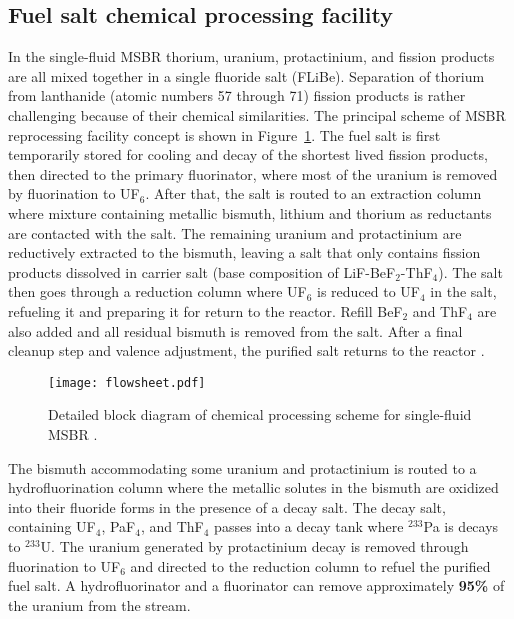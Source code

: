 \subsection{Fuel salt chemical processing facility}
In the single-fluid \gls{MSBR} thorium, uranium, 
protactinium, and fission products are all mixed together in a single fluoride salt (FLiBe). Separation of thorium from lanthanide (atomic numbers 57 through 71) fission products is rather challenging because of their chemical similarities. The principal scheme of \gls{MSBR} reprocessing facility concept is shown in Figure~\ref{fig:material_flow}. The fuel salt is first temporarily stored for cooling and decay of the shortest lived fission products, then directed to the primary fluorinator, where most of the uranium is removed by fluorination to UF$_6$. After that, the salt is routed to an extraction column where mixture containing metallic bismuth, lithium and thorium as reductants are contacted with the salt. The remaining uranium and protactinium are reductively extracted to the bismuth, leaving a salt that only contains fission products dissolved in carrier salt (base composition of LiF-BeF$_2$-ThF$_4$). The salt then goes through a reduction column where UF$_6$ is reduced to UF$_4$ in the salt, refueling it and preparing it for return to the reactor. Refill BeF$_2$ and ThF$_4$ are also added and all residual bismuth is removed from the salt. After a final cleanup step and valence adjustment, the purified salt returns to the reactor \cite{carter_design_1972,sorensen_one-fluid_2006}.
\begin{figure}[htp!] %
  \centering
  \texttt{[image: flowsheet.pdf]}
  \caption{Detailed block diagram of chemical processing scheme for single-fluid \gls{MSBR} \cite{robertson_conceptual_1971, sorensen_one-fluid_2006}.}
  \label{fig:material_flow}
\end{figure}

The bismuth accommodating some uranium and protactinium is routed to a hydrofluorination column where the metallic solutes in the bismuth are oxidized into their fluoride forms in the presence of a decay salt. The decay salt, containing UF$_4$, PaF$_4$, and ThF$_4$ passes into a decay tank where $^{233}$Pa is decays to $^{233}$U. The uranium generated by protactinium decay is removed through fluorination to UF$_6$ and directed to the reduction column to refuel the purified fuel salt. A hydrofluorinator and a fluorinator can remove approximately \textbf{95\%} of the uranium from the stream.

